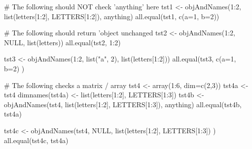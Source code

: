 \documentclass{article}
\begin{document}
\begin{Examples}
\begin{ExampleCode}
# The following should NOT check 'anything' here
tst1 <- objAndNames(1:2, list(letters[1:2], LETTERS[1:2]), anything)
all.equal(tst1, c(a=1, b=2))

# The following should return 'object unchanged
tst2 <- objAndNames(1:2, NULL, list(letters))
all.equal(tst2, 1:2)

tst3 <- objAndNames(1:2, list("a", 2), list(letters[1:2]))
all.equal(tst3, c(a=1, b=2) )

# The following checks a matrix / array
tst4 <- array(1:6, dim=c(2,3))
tst4a <- tst4
dimnames(tst4a) <- list(letters[1:2], LETTERS[1:3])
tst4b <- objAndNames(tst4, 
       list(letters[1:2], LETTERS[1:3]), anything)
all.equal(tst4b, tst4a)

tst4c <- objAndNames(tst4, NULL,        
       list(letters[1:2], LETTERS[1:3]) )
all.equal(tst4c, tst4a)

\end{ExampleCode}
\end{Examples}
\end{document}
